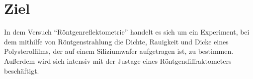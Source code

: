 \section{Ziel}
\label{sec:Ziel}

In dem Versuch \enquote{Röntgenreflektometrie} handelt es sich um ein Experiment, bei dem mithilfe von Röntgenstrahlung die Dichte, Rauigkeit und Dicke eines
Polysterolfilms, der auf einem Siliziumwafer aufgetragen ist, zu bestimmen.
Außerdem wird sich intensiv mit der Justage eines Röntgendiffraktometers beschäftigt.